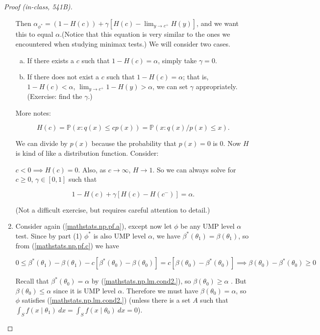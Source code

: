 \begin{proof}[Proof (in-class, 541B)]
\begin{enumerate}
Then \(\alpha_{\phi^*} = (1 - H(c)) + \gamma[ H(c) - \lim_{y \to c^+} H(y) ]\), and we want this to equal \(\alpha\).(Notice that this equation is very similar to the ones we encountered when studying minimax tests.) We will consider two cases.

\begin{enumerate}[(a)]

\item If there exists a \(c\) such that \(1 - H(c) = \alpha\), simply take \(\gamma = 0\).

\item If there does not exist a \(c\) such that \(1 - H(c) = \alpha\); that is, \(1 - H(c) < \alpha\), \(\lim_{y \to c^+} 1 - H(y) > \alpha\), we can set \(\gamma\) appropriately. (Exercise: find the \(\gamma\).)

\end{enumerate}

More notes:

\[
H(c) = \mathbb{P}(x: q(x) \leq c p(x) ) = \mathbb{P}(x: q(x)/p(x) \leq x).
\]

We can divide by \(p(x)\) because the probability that \(p(x)= 0\) is 0. Now \(H\) is kind of like a distribution function. Consider:

\(c < 0 \implies H(c) =0 \). Also, as \(c \to \infty\), \(H \to 1\). So we can always solve for \(c \geq 0\), \(\gamma \in [0,1]\) such that 

\[
1 - H(c)  + \gamma[ H(c) - H(c^-) ] = \alpha.
\]

(Not a difficult exercise, but requires careful attention to detail.)

\item 

Consider again (\ref{mathstats.np.pf.a}), except now let \(\phi\) be any UMP level \(\alpha\) test. Since by part (1) \(\phi^*\) is also UMP level \(\alpha\), we have \(\beta^*(\theta_1) = \beta(\theta_1)\), so from (\ref{mathstats.np.pf.c}) we have

\[
0 \leq \beta^*(\theta_1) - \beta(\theta_1) - c \left[ \beta^*(\theta_0) - \beta(\theta_0) \right] = c \left[ \beta(\theta_0)  -  \beta^*(\theta_0) \right] \implies  \beta(\theta_0)  -  \beta^*(\theta_0) \geq 0
\]

Recall that \(\beta^*(\theta_0) = \alpha\) by (\ref{mathstats.np.lm.cond2.}), so \(  \beta(\theta_0) \geq \alpha\) . But \(  \beta(\theta_0) \leq \alpha\) since it is UMP level \(\alpha\). Therefore we must have \(  \beta(\theta_0) = \alpha\), so \(\phi\) satisfies (\ref{mathstats.np.lm.cond2.}) (unless there is a set \(A\) such that \(\int_S f(x \mid \theta_1) \ dx = \int_S f(x \mid \theta_0) \ dx = 0\)).



\end{enumerate}
\end{proof}
